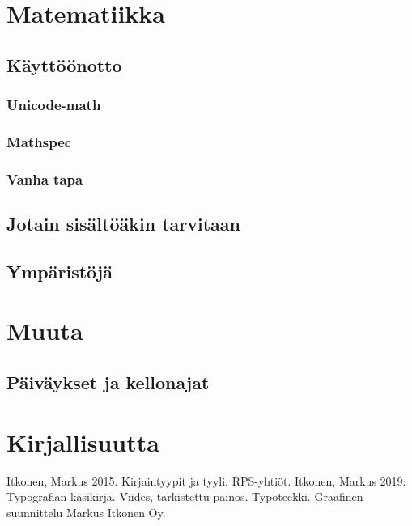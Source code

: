 \documentclass[notitlepage,oneside]{book}
\newenvironment{teosluettelo}%
{\begin{thebibliography}{99}}%
  {\end{thebibliography}}
\begin{document}
\clearpage
\pagestyle{plain}







\chapter{Matematiikka}
\label{luku:matematiikka}
\section{Käyttöönotto}
\subsection{Unicode-math}
\subsection{Mathspec}
\subsection{Vanha tapa}
\section{Jotain sisältöäkin tarvitaan}
\section{Ympäristöjä}

\chapter{Muuta}
\section{Päiväykset ja kellonajat}

\backmatter
\chapter{Kirjallisuutta}

\begin{teosluettelo}
 Itkonen, Markus 2015. Kirjaintyypit
  ja tyyli. RPS-yhtiöt.
 Itkonen, Markus 2019: Typografian
  käsikirja. Viides, tarkistettu painos. Typoteekki. Graafinen
  suunnittelu Markus Itkonen Oy.
\end{teosluettelo}

\printindex
\end{document}
